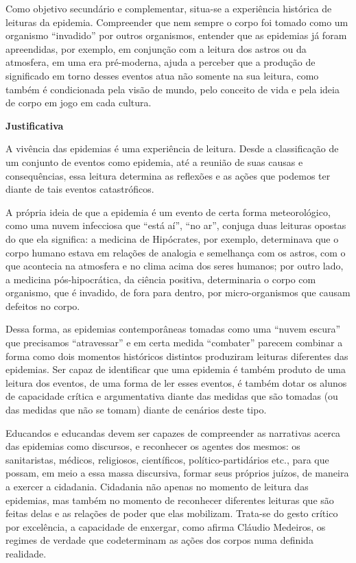 \documentclass[12pt]{extarticle}
\begin{document}
Como objetivo secundário e complementar, situa-se a experiência
histórica de leituras da epidemia. Compreender que nem sempre o corpo
foi tomado como um organismo ``invadido'' por outros organismos,
entender que as epidemias já foram apreendidas, por exemplo, em
conjunção com a leitura dos astros ou da atmosfera, em uma era
pré-moderna, ajuda a perceber que a produção de significado em torno
desses eventos atua não somente na sua leitura, como também é
condicionada pela visão de mundo, pelo conceito de vida e pela ideia de
corpo em jogo em cada cultura.

\textbf{Justificativa}

A vivência das epidemias é uma experiência de leitura. Desde a
classificação de um conjunto de eventos como epidemia, até a reunião de
suas causas e consequências, essa leitura determina as reflexões e as
ações que podemos ter diante de tais eventos catastróficos.

A própria ideia de que a epidemia é um evento de certa forma
meteorológico, como uma nuvem infecciosa que ``está aí'', ``no ar'',
conjuga duas leituras opostas do que ela significa: a medicina de
Hipócrates, por exemplo, determinava que o corpo humano estava em
relações de analogia e semelhança com os astros, com o que acontecia na
atmosfera e no clima acima dos seres humanos; por outro lado, a medicina
pós-hipocrática, da ciência positiva, determinaria o corpo com
organismo, que é invadido, de fora para dentro, por micro-organismos que
causam defeitos no corpo.

Dessa forma, as epidemias contemporâneas tomadas como uma ``nuvem
escura'' que precisamos ``atravessar'' e em certa medida ``combater''
parecem combinar a forma como dois momentos históricos distintos
produziram leituras diferentes das epidemias. Ser capaz de identificar
que uma epidemia é também produto de uma leitura dos eventos, de uma
forma de ler esses eventos, é também dotar os alunos de capacidade
crítica e argumentativa diante das medidas que são tomadas (ou das
medidas que não se tomam) diante de cenários deste tipo.

Educandos e educandas devem ser capazes de compreender as narrativas
acerca das epidemias como discursos, e reconhecer os agentes dos mesmos:
os sanitaristas, médicos, religiosos, científicos, político-partidários
etc., para que possam, em meio a essa massa discursiva, formar seus
próprios juízos, de maneira a exercer a cidadania. Cidadania não apenas
no momento de leitura das epidemias, mas também no momento de reconhecer
diferentes leituras que são feitas delas e as relações de poder que elas
mobilizam. Trata-se do gesto crítico por excelência, a capacidade de
enxergar, como afirma Cláudio Medeiros, os regimes de verdade que
codeterminam as ações dos corpos numa definida realidade.
\end{document}
